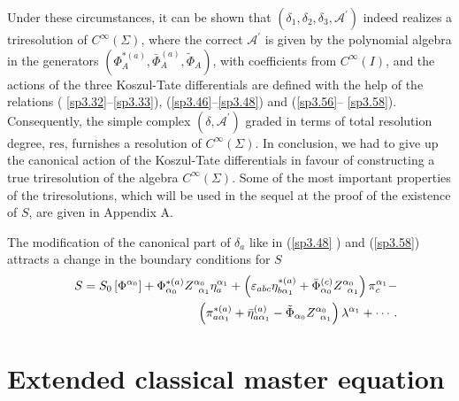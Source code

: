 \documentclass[a4paper,12pt]{article}
\begin{document}
Under these circumstances, it can be shown that $\left( \delta _{1},\delta
_{2},\delta _{3},\mathcal{A}^{\prime }\right) $ indeed realizes a
triresolution of $C^{\infty }\left( \Sigma \right) $, where the correct $%
\mathcal{A}^{\prime }$ is given by the polynomial algebra in the generators $%
\left( \Phi _{A}^{*(a)},\bar{\Phi}_{A}^{(a)},\tilde{\Phi}_{A}\right) $, with
coefficients from $C^{\infty }\left( I\right) $, and the actions of the
three Koszul-Tate differentials are defined with the help of the relations (%
\ref{sp3.32}--\ref{sp3.33}), (\ref{sp3.46}--\ref{sp3.48}) and (\ref{sp3.56}--%
\ref{sp3.58}). Consequently, the simple complex $\left( \delta ,\mathcal{A}%
^{\prime }\right) $ graded in terms of total resolution degree, $\mathrm{res}
$, furnishes a resolution of $C^{\infty }\left( \Sigma \right) $. In
conclusion, we had to give up the canonical action of the Koszul-Tate
differentials in favour of constructing a true triresolution of the algebra $%
C^{\infty }\left( \Sigma \right) $. Some of the most important properties of
the triresolutions, which will be used in the sequel at the proof of the
existence of $S$, are given in Appendix A.

The modification of the canonical part of $\delta _{a}$ like in (\ref{sp3.48}%
) and (\ref{sp3.58}) attracts a change in the boundary conditions for $S$ 
\begin{eqnarray}
&&S=S_{0}\left[ \Phi ^{\alpha _{0}}\right] +\Phi _{\alpha
_{0}}^{*(a)}Z_{\;\;\alpha _{1}}^{\alpha _{0}}\eta _{a}^{\alpha _{1}}+\left(
\varepsilon _{abc}\eta _{b\alpha _{1}}^{*(a)}+\bar{\Phi}_{\alpha
_{0}}^{(c)}Z_{\;\;\alpha _{1}}^{\alpha _{0}}\right) \pi _{c}^{\alpha _{1}}- 
\nonumber \\
&&\left( \pi _{a\alpha _{1}}^{*(a)}+\bar{\eta}_{a\alpha _{1}}^{(a)}-\tilde{%
\Phi}_{\alpha _{0}}Z_{\;\;\alpha _{1}}^{\alpha _{0}}\right) \lambda ^{\alpha
_{1}}+\cdots .  \label{sp3.65}
\end{eqnarray}

\section{Extended classical master equation}
\end{document}
